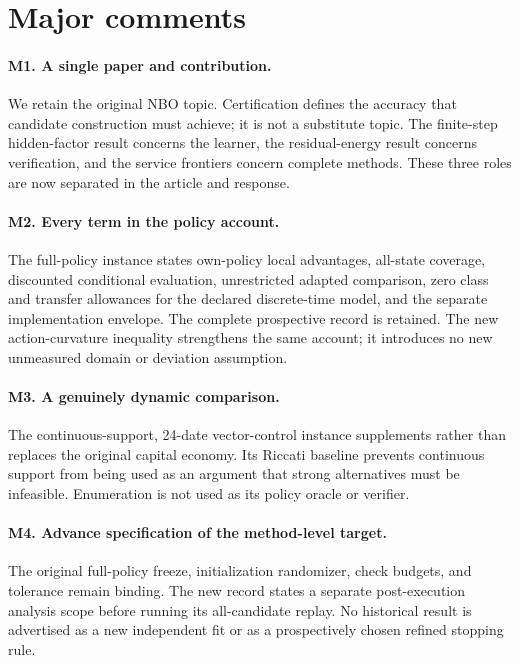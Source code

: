 \section*{Major comments}
\paragraph{M1. A single paper and contribution.}
We retain the original NBO topic. Certification defines the accuracy that
candidate construction must achieve; it is not a substitute topic. The
finite-step hidden-factor result concerns the learner, the residual-energy
result concerns verification, and the service frontiers concern complete
methods. These three roles are now separated in the article and response.

\paragraph{M2. Every term in the policy account.}
The full-policy instance states own-policy local advantages, all-state
coverage, discounted conditional evaluation, unrestricted adapted comparison,
zero class and transfer allowances for the declared discrete-time model, and
the separate implementation envelope. The complete prospective record is
retained. The new action-curvature inequality strengthens the same account;
it introduces no new unmeasured domain or deviation assumption.

\paragraph{M3. A genuinely dynamic comparison.}
The continuous-support, 24-date vector-control instance supplements rather
than replaces the original capital economy. Its Riccati baseline prevents
continuous support from being used as an argument that strong alternatives
must be infeasible. Enumeration is not used as its policy oracle or verifier.

\paragraph{M4. Advance specification of the method-level target.}
The original full-policy freeze, initialization randomizer, check budgets,
and tolerance remain binding. The new record states a separate
post-execution analysis scope before running its all-candidate replay.
No historical result is advertised as a new independent fit or as a
prospectively chosen refined stopping rule.

